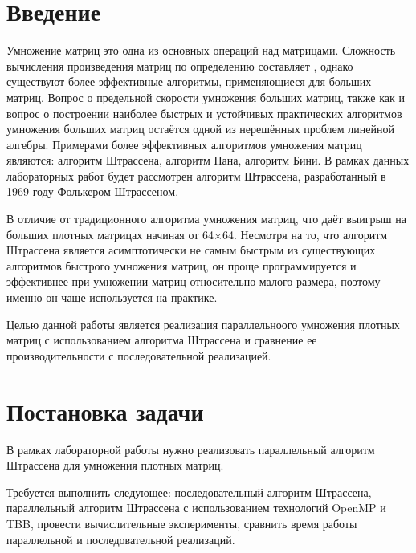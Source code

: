 \documentclass{report}
\begin{document}
\setcounter{page}{2}

\newpage

\section*{Введение}
Умножение матриц это одна из основных операций над матрицами. Сложность вычисления произведения матриц по определению составляет  , однако существуют более эффективные алгоритмы, применяющиеся для больших матриц. Вопрос о предельной скорости умножения больших матриц, также как и вопрос о построении наиболее быстрых и устойчивых практических алгоритмов умножения больших матриц остаётся одной из нерешённых проблем линейной алгебры. Примерами более эффективных алгоритмов умножения матриц являются: алгоритм Штрассена, алгоритм Пана, алгоритм Бини. В рамках данных лабораторных работ будет рассмотрен алгоритм Штрассена, разработанный в 1969 году Фолькером Штрассеном.
\par
В отличие от традиционного алгоритма умножения матриц, что даёт выигрыш на больших плотных матрицах начиная от 64×64. Несмотря на то, что алгоритм Штрассена является асимптотически не самым быстрым из существующих алгоритмов быстрого умножения матриц, он проще программируется и эффективнее при умножении матриц относительно малого размера, поэтому именно он чаще используется на практике.
\par
Целью данной работы является реализация параллельноого умножения плотных матриц с использованием алгоритма Штрассена и сравнение ее производительности с последовательной реализацией.
\newpage

\section*{Постановка задачи}
В рамках лабораторной работы нужно реализовать параллельный алгоритм Штрассена для умножения плотных матриц.
\par
Требуется выполнить следующее: последовательный алгоритм Штрассена, параллельный алгоритм Штрассена  с использованием технологий OpenMP и TBB, провести вычислительные эксперименты, сравнить время работы параллельной и последовательной реализаций.
\newpage

\end{document}
